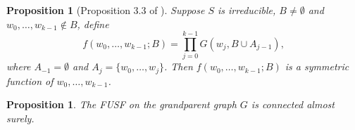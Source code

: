 \documentclass[12pt]{article}
\newtheorem{proposition}[theorem]{Proposition}
\numberwithin{equation}{section}
\newcommand{\1}{\mathbf{1}}
\begin{document}
 \begin{proposition}[Proposition 3.3 of  \cite{Lawler2018}]\label{prop: symmetry about ordering}
 	Suppose $S$ is irreducible, $B\neq\emptyset$ and $w_0,\ldots,w_{k-1}\notin B$, define
 	\[
 	f(w_0,\ldots,w_{k-1};B)=\prod_{j=0}^{k-1}G(w_j,B\cup A_{j-1}),
 	\]
 	where $A_{-1}=\emptyset$ and $A_j=\{w_0,\ldots,w_j \}$.
 	Then $f(w_0,\ldots,w_{k-1};B)$ is a symmetric function of $w_0,\ldots,w_{k-1}$.
 \end{proposition}
 
 
\begin{proposition}\label{prop: FUSF on grandparent graph is a tree}
	The FUSF on the grandparent graph $G$ is connected almost surely.
\end{proposition}
\end{document}
